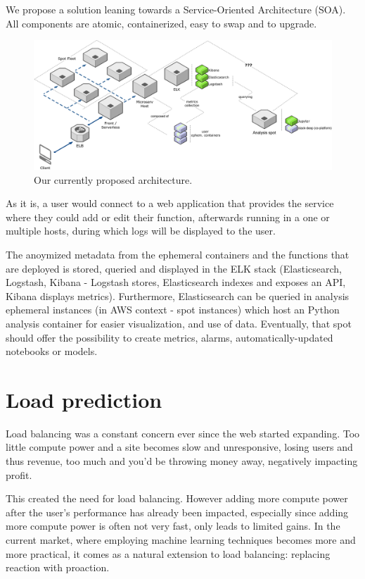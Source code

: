 \documentclass[runningheads]{llncs}
\begin{document}
We propose a solution leaning towards a Service-Oriented Architecture (SOA). All components are atomic, containerized, easy to swap and to upgrade.

\begin{figure}
    \centering
    \includegraphics[scale=0.22]{assets/init_min.png}
    \caption[Architecture]{Our currently proposed architecture.}
    \label{fig:Architecture-01}
\end{figure}

As it is, a user would connect to a web application that provides the service where they could add or edit their function, afterwards running in a one or multiple hosts, during which logs will be displayed to the user.

The anoymized metadata from the ephemeral containers and the functions that are deployed is stored, queried and displayed in the ELK stack (Elasticsearch, Logstash, Kibana - Logstash stores, Elasticsearch indexes and exposes an API, Kibana displays metrics). Furthermore, Elasticsearch can be queried in analysis ephemeral instances (in AWS context - spot instances) which host an Python analysis container for easier visualization, and use of data. Eventually, that spot should offer the possibility to create metrics, alarms, automatically-updated notebooks or models.


\FloatBarrier
\section{Load prediction}


Load balancing was a constant concern ever since the web started expanding. Too little compute power and a site becomes slow and unresponsive, losing users and thus revenue, too much and you’d be throwing money away, negatively impacting profit. 

This created the need for load balancing. However adding more compute power after the user’s performance has already been impacted, especially since adding more compute power is often not very fast, only leads to limited gains. In the current market, where employing machine learning techniques becomes more and more practical, it comes as a natural extension to load balancing: replacing reaction with proaction.
\end{document}
